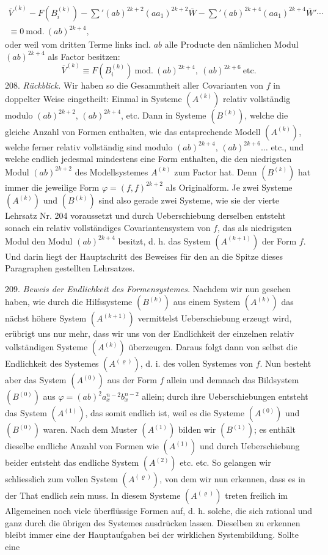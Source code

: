 \documentclass[11pt]{article}
\providecommand{\weberpage}[1]{}
\begin{document}
\weberpage{235}
\[
\begin{gathered}
\overline{V}^{(k)} - F(B_i^{(k)}) - \sum{}'(ab)^{2k+2}(aa_1)^{2k+2}\overline{W} - \sum{}'(ab)^{2k+4}(aa_1)^{2k+4}\overline{W}' \cdots \\
\equiv 0 \ \mathrm{mod.}\ (ab)^{2k+4},
\end{gathered}
\]
oder weil vom dritten Terme links incl. $ab$ alle Producte den nämlichen
 Modul $(ab)^{2k+4}$ als Factor besitzen:
\[
\overline{V}^{(k)} \equiv F(B_i^{(k)}) \ \mathrm{mod.}\ (ab)^{2k+4},\ (ab)^{2k+6}\ \text{etc.}
\]
208. \textit{Rückblick.} Wir haben so die Gesammtheit aller Covarianten
von $f$ in doppelter Weise eingetheilt: Einmal in Systeme $(A^{(k)})$ relativ
vollständig modulo $(ab)^{2k+2}$, $(ab)^{2k+4}$, etc. Dann in Systeme $(B^{(k)})$,
welche die gleiche Anzahl von Formen enthalten, wie das
entsprechende Modell $(A^{(k)})$, welche ferner relativ vollständig sind
modulo $(ab)^{2k+4}$, $(ab)^{2k+6} \ldots$ etc., und welche endlich jedesmal mindestens
eine Form enthalten, die den niedrigsten Modul $(ab)^{2k+2}$ des Modellsystemes
 $A^{(k)}$ zum Factor hat. Denn $(B^{(k)})$ hat immer die jeweilige
Form $\varphi = (f,f)^{2k+2}$ als Originalform. Je zwei Systeme $(A^{(k)})$ und
$(B^{(k)})$ sind also gerade zwei Systeme, wie sie der vierte Lehrsatz
Nr. 204 voraussetzt und durch Ueberschiebung derselben entsteht
sonach ein relativ vollständiges Covariantensystem von $f$, das als
niedrigsten Modul den Modul $(ab)^{2k+4}$ besitzt, d. h. das System
$(A^{(k+1)})$ der Form $f$. Und darin liegt der Hauptschritt des Beweises für
den an die Spitze dieses Paragraphen gestellten Lehrsatzes.

209. \textit{Beweis der Endlichkeit des Formensystemes.} Nachdem wir
nun gesehen haben, wie durch die Hilfssysteme $(B^{(k)})$ aus einem System
$(A^{(k)})$ das nächst höhere System $(A^{(k+1)})$ vermittelst Ueberschiebung
erzeugt wird, erübrigt uns nur mehr, dass wir uns von der Endlichkeit
 der einzelnen relativ vollständigen Systeme $(A^{(k)})$ überzeugen.
Daraus folgt dann von selbst die Endlichkeit des Systemes $(A^{(\varrho)})$,
d. i. des vollen Systemes von $f$. Nun besteht aber das System $(A^{(0)})$
aus der Form $f$ allein und demnach das Bildsystem $(B^{(0)})$ aus
$\varphi = (ab)^2 a_x^{n-2} b_x^{n-2}$ allein; durch ihre Ueberschiebungen entsteht das
System $(A^{(1)})$, das somit endlich ist, weil es die Systeme $(A^{(0)})$ und
$(B^{(0)})$ waren. Nach dem Muster $(A^{(1)})$ bilden wir $(B^{(1)})$; es enthält
dieselbe endliche Anzahl von Formen wie $(A^{(1)})$ und durch Ueberschiebung
 beider entsteht das endliche System $(A^{(2)})$ etc. etc. So gelangen
 wir schliesslich zum vollen System $(A^{(\varrho)})$, von dem wir nun
erkennen, dass es in der That endlich sein muss. In diesem Systeme
$(A^{(\varrho)})$ treten freilich im Allgemeinen noch viele überflüssige Formen
auf, d. h. solche, die sich rational und ganz durch die übrigen des
Systemes ausdrücken lassen. Dieselben zu erkennen bleibt immer eine
der Hauptaufgaben bei der wirklichen Systembildung. Sollte eine
\end{document}
